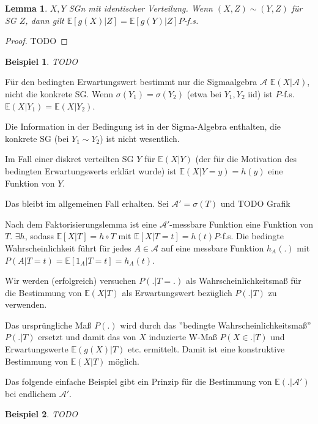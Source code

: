 \documentclass[]{article}
\newtheorem{lemma}{Lemma}
\newtheorem*{example}{Beispiel}
\begin{document}
\begin{lemma}
	$X,Y$ SGn mit identischer Verteilung. Wenn $(X,Z)\sim (Y,Z)$ für SG $Z$, dann gilt $\mathbb{E}[g(X)|Z] = \mathbb{E}[g(Y)|Z] P$-f.s.
\end{lemma}

\begin{proof}
	TODO
\end{proof}

\begin{example}
	TODO
\end{example}

Für den bedingten Erwartungswert bestimmt nur die Sigmaalgebra $\mathcal{A}$ $\mathbb{E}(X|\mathcal{A})$, nicht die konkrete SG. Wenn $\sigma(Y_1)=\sigma(Y_2)$ (etwa bei $Y_1, Y_2$ iid) ist $P$-f.s. $\mathbb{E}(X|Y_1)=\mathbb{E}(X|Y_2)$.

Die Information in der Bedingung ist in der Sigma-Algebra enthalten, die konkrete SG (bei $Y_1 \sim Y_2$) ist nicht wesentlich.

Im Fall einer diskret verteilten SG $Y$ für $\mathbb{E}(X|Y)$ (der für die Motivation des bedingten Erwartungswerts erklärt wurde) ist $\mathbb{E}(X|Y=y)=h(y)$ eine Funktion von $Y$.

Das bleibt im allgemeinen Fall erhalten. Sei $\mathcal{A}' = \sigma(T)$ und 
TODO Grafik

Nach dem Faktorisierungslemma ist eine $\mathcal{A}'$-messbare Funktion eine Funktion von $T$. $\exists h$, sodass $\mathbb{E}[X|T]= h\circ T$ mit $\mathbb{E}[X|T=t] = h(t) P$-f.s. Die bedingte Wahrscheinlichkeit führt für jedes $A\in \mathcal{A}$ auf eine messbare Funktion $h_A(.)$ mit $P(A|T=t)=\mathbb{E}[1_A |T=t]=h_A(t)$.

Wir werden (erfolgreich) versuchen $P(.|T=.)$ als Wahrscheinlichkeitsmaß für die Bestimmung von $\mathbb{E}(X|T)$ als Erwartungswert bezüglich $P(.|T)$ zu verwenden.

Das ursprüngliche Maß $P(.)$ wird durch das ''bedingte Wahrscheinlichkeitsmaß'' $P(.|T)$ ersetzt und damit das von $X$ induzierte W-Maß $P(X\in . | T)$ und Erwartungswerte $\mathbb{E}(g(X)|T)$ etc. ermittelt. Damit ist eine konstruktive Bestimmung von $\mathbb{E}(X|T)$ möglich.

Das folgende einfache Beispiel gibt ein Prinzip für die Bestimmung von $\mathbb{E}(.|\mathcal{A}')$ bei endlichem $\mathcal{A}'$.

\begin{example}
	TODO
\end{example}
\end{document}
